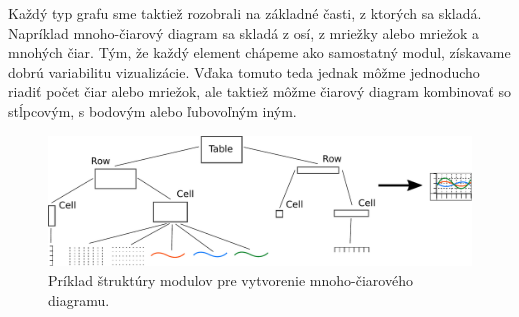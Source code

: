Každý typ grafu sme taktiež rozobrali na základné časti, z ktorých sa skladá. Napríklad mnoho-čiarový diagram sa skladá z osí, z mriežky alebo mriežok a mnohých čiar. Tým, že každý element chápeme ako samostatný modul, získavame dobrú variabilitu vizualizácie. Vďaka tomuto teda jednak môžme jednoducho riadiť počet čiar alebo mriežok, ale taktiež môžme čiarový diagram kombinovať so stĺpcovým, s bodovým alebo ľubovoľným iným.

\begin{figure}
	\centering
	\hspace*{-0.2in}
	\includegraphics[width = 6in]{tree}
	\caption{Príklad štruktúry modulov pre vytvorenie mnoho-čiarového diagramu.}
	\label{fig:tree} 
\end{figure}